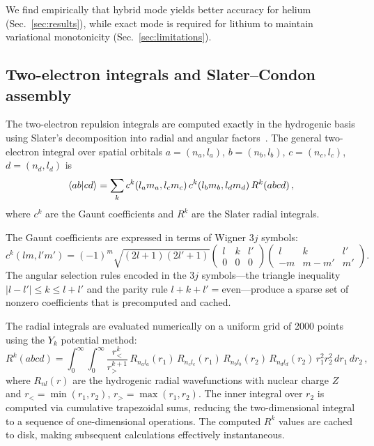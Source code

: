 \documentclass[aps,pra,twocolumn,superscriptaddress,longbibliography,floatfix]{revtex4-2}
\begin{document}
We find empirically that hybrid mode yields better accuracy for
helium (Sec.~\ref{sec:results}), while exact mode is required for
lithium to maintain variational monotonicity
(Sec.~\ref{sec:limitations}).

\subsection{Two-electron integrals and Slater--Condon assembly}
\label{sec:two_electron}

The two-electron repulsion integrals are computed exactly in the
hydrogenic basis using Slater's decomposition into radial and angular
factors~\cite{Slater1960,Condon1935}.
The general two-electron integral over spatial orbitals
$a = (n_a, l_a)$, $b = (n_b, l_b)$, $c = (n_c, l_c)$,
$d = (n_d, l_d)$ is
\begin{equation}
\braket{ab|cd} = \sum_k c^k(l_a m_a, l_c m_c)\,
c^k(l_b m_b, l_d m_d)\, R^k(abcd)\,,
\label{eq:eri}
\end{equation}
where $c^k$ are the Gaunt coefficients and $R^k$ are the Slater
radial integrals.

The Gaunt coefficients are expressed in terms of Wigner $3j$ symbols:
\begin{equation}
c^k(l m, l' m') = (-1)^m \sqrt{(2l+1)(2l'+1)}
\begin{pmatrix} l & k & l' \\ 0 & 0 & 0 \end{pmatrix}
\begin{pmatrix} l & k & l' \\ -m & m-m' & m' \end{pmatrix}.
\label{eq:gaunt}
\end{equation}
The angular selection rules encoded in the $3j$ symbols---the
triangle inequality $|l - l'| \leq k \leq l + l'$ and the parity
rule $l + k + l' = \text{even}$---produce a sparse set of nonzero
coefficients that is precomputed and cached.

The radial integrals are evaluated numerically on a uniform grid
of 2000 points using the $Y_k$ potential method:
\begin{equation}
R^k(abcd) = \int_0^{\infty} \int_0^{\infty}
\frac{r_<^k}{r_>^{k+1}}\,
R_{n_a l_a}(r_1)\, R_{n_c l_c}(r_1)\,
R_{n_b l_b}(r_2)\, R_{n_d l_d}(r_2)\,
r_1^2 r_2^2\, dr_1\, dr_2\,,
\label{eq:rk}
\end{equation}
where $R_{nl}(r)$ are the hydrogenic radial wavefunctions with
nuclear charge $Z$ and $r_< = \min(r_1, r_2)$,
$r_> = \max(r_1, r_2)$.
The inner integral over $r_2$ is computed via cumulative trapezoidal
sums, reducing the two-dimensional integral to a sequence of
one-dimensional operations.
The computed $R^k$ values are cached to disk, making subsequent
calculations effectively instantaneous.
\end{document}
